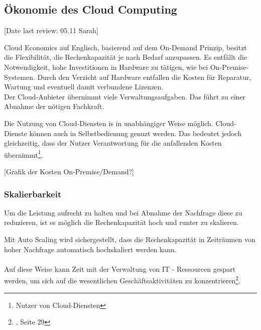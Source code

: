 \subsection{Ökonomie des Cloud Computing}\label{subsec_UabsGrund3}
[Date last review: 05.11 Sarah]
\begin{flushleft}
      
            Cloud Economics auf Englisch, basierend auf dem On-Demand Prinzip, besitzt die Flexibilität, die Rechenkapazität je nach Bedarf anzupassen.
            Es entfällt die Notwendigkeit, hohe Investitionen in Hardware zu tätigen, wie bei On-Premise-Systemen.
            Durch den Verzicht auf Hardware entfallen die Kosten für Reparatur, Wartung und eventuell damit verbundene Lizenzen. 
            \\
            Der Cloud-Anbieter übernimmt viele Verwaltungsaufgaben. Das führt zu einer Abnahme der nötigen Fachkraft.
            {\cite{IDC01}}

           Die Nutzung von Cloud-Diensten is in unabhängiger Weise möglich. 
           Cloud-Dienste können auch in Selbstbedienung genuzt werden. Das bedeutet jedoch gleichzeitig, dass der Nutzer Verantwortung für die anfallenden Kosten übernimmt\footnote{Nutzer von Cloud-Diensten}.
\end{flushleft}

[Grafik der Kosten On-Premise/Demand?]

\subsubsection{Skalierbarkeit}
Um die Leistung aufrecht zu halten und bei Abnahme der Nachfrage diese zu reduzieren,  ist es möglich die Rechenkapazität hoch und runter zu skalieren.

Mit Auto Scaling wird sichergestellt, dass die Rechenkapazität in Zeiträumen von hoher Nachfrage automatisch hochskaliert werden kann.
\\\\
Auf diese Weise kann Zeit mit der Verwaltung von IT - Ressourcen gespart werden, um sich auf die wesentlichen Geschäftsaktivitäten zu konzentrieren\footnote{{\cite{AWS1}}, Seite 29}.

